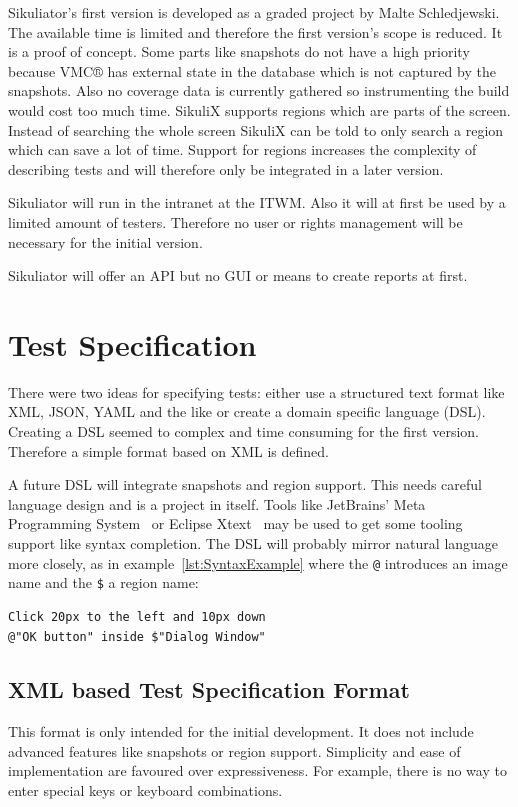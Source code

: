 \documentclass[a4paper,twocolumn,twoside]{article}
\newcommand{\VMC}[0]{VMC®}
\newcommand{\Sik}[0]{Sikuliator}
\begin{document}
\Sik{}'s first version is developed as a graded project by Malte Schledjewski.
The available time is limited and therefore the first version's scope is reduced.
It is a proof of concept.
Some parts like snapshots do not have a high priority because \VMC{} has external state in the database which is not captured by the snapshots. 
Also no coverage data is currently gathered so instrumenting the build would cost too much time. 
SikuliX supports regions which are parts of the screen.
Instead of searching the whole screen SikuliX can be told to only search a region which can save a lot of time. 
Support for regions increases the complexity of describing tests and will therefore only be integrated in a later version.

\Sik{} will run in the intranet at the ITWM.
Also it will at first be used by a limited amount of testers.
Therefore no user or rights management will be necessary for the initial version.

\Sik{} will offer an API but no GUI or means to create reports at first.



\section{Test Specification}
There were two ideas for specifying tests: either use a structured text format like XML, JSON, YAML and the like or create a domain specific language (DSL).
Creating a DSL seemed to complex and time consuming for the first version.
Therefore a simple format based on XML is defined.

A future DSL will integrate snapshots and region support.
This needs careful language design and is a project in itself.
Tools like JetBrains' Meta Programming System~\cite{MPS}
or Eclipse Xtext~\cite{Xtext} may be used to get some tooling support like syntax completion.
The DSL will probably mirror natural language more closely, 
as in example~\ref{lst:SyntaxExample} where the \texttt{@} introduces an image name and the \texttt{\$} a region name:

\renewcommand{\lstlistingname}{Example}
\begin{lstlisting}[language=Pseudo,caption={Example for possible syntax},label={lst:SyntaxExample}]
Click 20px to the left and 10px down 
@"OK button" inside $"Dialog Window"
\end{lstlisting}

\subsection*{XML based Test Specification Format}
This format is only intended for the initial development.
It does not include advanced features like snapshots or region support.
Simplicity and ease of implementation are favoured over expressiveness.
For example, there is no way to enter special keys or keyboard combinations.
\end{document}
